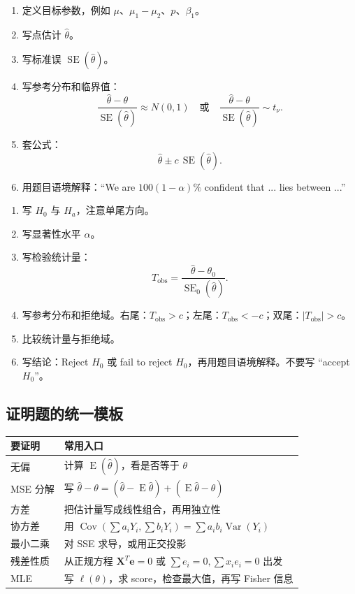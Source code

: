 \documentclass[11pt,a4paper]{article}
\newcommand{\E}{\operatorname{E}}
\newcommand{\Var}{\operatorname{Var}}
\newcommand{\Cov}{\operatorname{Cov}}
\newcommand{\SE}{\operatorname{SE}}
\newcommand{\bX}{\mathbf{X}}
\newcommand{\be}{\mathbf{e}}
\begin{document}
\begin{templatebox}[置信区间模板]
\begin{enumerate}
  \item 定义目标参数，例如 $\mu$、$\mu_1-\mu_2$、$p$、$\beta_1$。
  \item 写点估计 $\hat\theta$。
  \item 写标准误 $\SE(\hat\theta)$。
  \item 写参考分布和临界值：
  \[
    \frac{\hat\theta-\theta}{\SE(\hat\theta)} \approx N(0,1)
    \quad\text{或}\quad
    \frac{\hat\theta-\theta}{\SE(\hat\theta)} \sim t_\nu .
  \]
  \item 套公式：
  \[
    \hat\theta \pm c\,\SE(\hat\theta).
  \]
  \item 用题目语境解释：“We are $100(1-\alpha)\%$ confident that ... lies between ...”
\end{enumerate}
\end{templatebox}

\begin{templatebox}[临界值法检验模板]
\begin{enumerate}
  \item 写 $H_0$ 与 $H_a$，注意单尾方向。
  \item 写显著性水平 $\alpha$。
  \item 写检验统计量：
  \[
    T_{\mathrm{obs}}=\frac{\hat\theta-\theta_0}{\SE_0(\hat\theta)}.
  \]
  \item 写参考分布和拒绝域。右尾：$T_{\mathrm{obs}}>c$；左尾：$T_{\mathrm{obs}}<-c$；双尾：$|T_{\mathrm{obs}}|>c$。
  \item 比较统计量与拒绝域。
  \item 写结论：Reject $H_0$ 或 fail to reject $H_0$，再用题目语境解释。不要写 “accept $H_0$”。
\end{enumerate}
\end{templatebox}

\subsection{证明题的统一模板}

\begin{methodbox}
\begin{center}
\begin{tabular}{ll}
\toprule
要证明 & 常用入口\\
\midrule
无偏 & 计算 $\E(\hat\theta)$，看是否等于 $\theta$\\
MSE 分解 & 写 $\hat\theta-\theta=(\hat\theta-\E\hat\theta)+(\E\hat\theta-\theta)$\\
方差 & 把估计量写成线性组合，再用独立性\\
协方差 & 用 $\Cov(\sum a_iY_i,\sum b_iY_i)=\sum a_ib_i\Var(Y_i)$\\
最小二乘 & 对 SSE 求导，或用正交投影\\
残差性质 & 从正规方程 $\bX^T\be=0$ 或 $\sum e_i=0,\sum x_ie_i=0$ 出发\\
MLE & 写 $\ell(\theta)$，求 score，检查最大值，再写 Fisher 信息\\
\bottomrule
\end{tabular}
\end{center}
\end{methodbox}
\end{document}
